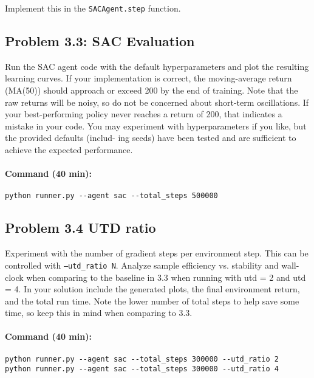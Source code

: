 \documentclass[12pt]{article}
\begin{document}
\noindent
Implement this in the \texttt{SACAgent.step} function.

\subsection*{Problem 3.3: SAC Evaluation}

Run the SAC agent code with the default hyperparameters and plot the resulting learning curves.
If your implementation is correct, the moving-average return (MA(50)) should approach
or exceed 200 by the end of training. Note that the raw returns will be noisy, so do not
be concerned about short-term oscillations. If your best-performing policy never reaches a
return of 200, that indicates a mistake in your code.
You may experiment with hyperparameters if you like, but the provided defaults (includ-
ing seeds) have been tested and are sufficient to achieve the expected performance.

\paragraph{Command (40 min):}
\begin{verbatim}
python runner.py --agent sac --total_steps 500000
\end{verbatim}

\begin{solution}[height=5cm]
\end{solution}

\subsection*{Problem 3.4 UTD ratio}
Experiment with the number of gradient steps per environment step.  This can be controlled with \texttt{--utd\_ratio N}. Analyze sample efficiency vs. stability and wall-clock when comparing to the baseline in 3.3 when running with utd = 2 and utd = 4.  In your solution include the generated plots, the final environment return, and the total run time. Note the lower number of total steps to help save some time, so keep this in mind when comparing to 3.3.

\paragraph{Command (40 min):}
\begin{verbatim}
python runner.py --agent sac --total_steps 300000 --utd_ratio 2
python runner.py --agent sac --total_steps 300000 --utd_ratio 4
\end{verbatim}
\end{document}
